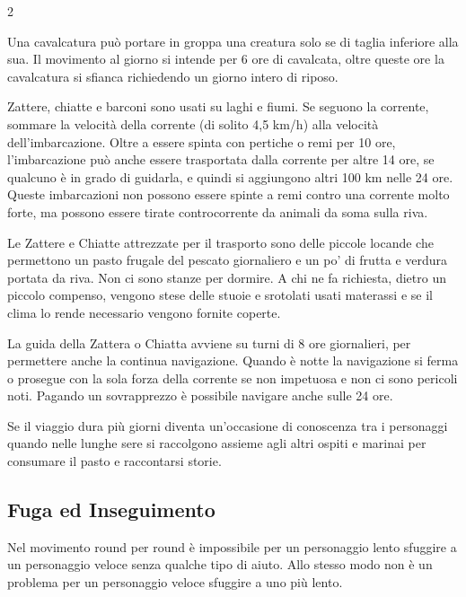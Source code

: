 \begin{multicols}{2}

\bigskip

Una cavalcatura può portare in groppa una creatura solo se di taglia inferiore alla sua. Il movimento al giorno si intende per 6 ore di cavalcata, oltre queste ore la cavalcatura si sfianca richiedendo un giorno intero di riposo.

Zattere, chiatte e barconi sono usati su laghi e fiumi. Se seguono la corrente, sommare la velocità della corrente (di solito 4,5 km/h) alla velocità dell'imbarcazione. Oltre a essere spinta con pertiche o remi per 10 ore, l'imbarcazione può anche essere trasportata dalla corrente per altre 14 ore, se qualcuno è in grado di guidarla, e quindi si aggiungono altri 100 km nelle 24 ore. Queste imbarcazioni non possono essere spinte a remi contro una corrente molto forte, ma possono essere tirate controcorrente da animali da soma sulla riva.

Le Zattere e Chiatte attrezzate per il trasporto sono delle piccole locande che permettono un pasto frugale del pescato giornaliero e un po' di frutta e verdura portata da riva. Non ci sono stanze per dormire. A chi ne fa richiesta, dietro un piccolo compenso, vengono stese delle stuoie e srotolati usati materassi e se il clima lo rende necessario vengono fornite coperte.

La guida della Zattera o Chiatta avviene su turni di 8 ore giornalieri, per permettere anche la continua navigazione. Quando è notte la navigazione si ferma o prosegue con la sola forza della corrente se non impetuosa e non ci sono pericoli noti. Pagando un sovrapprezzo è possibile navigare anche sulle 24 ore.

Se il viaggio dura più giorni diventa un'occasione di conoscenza tra i personaggi quando nelle lunghe sere si raccolgono assieme agli altri ospiti e marinai per consumare il pasto e raccontarsi storie.

\subsection{Fuga ed Inseguimento}\label{fugainseguimento}

Nel movimento round per round è impossibile per un personaggio lento sfuggire a un personaggio veloce senza qualche tipo di aiuto. Allo stesso modo non è un problema per un personaggio veloce sfuggire a uno più lento.


\end{multicols}
